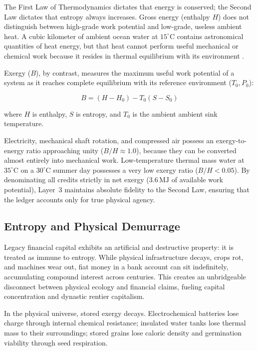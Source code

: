 The First Law of Thermodynamics dictates that energy is conserved; the Second Law dictates that entropy always increases. Gross energy (enthalpy $H$) does not distinguish between high-grade work potential and low-grade, useless ambient heat. A cubic kilometer of ambient ocean water at $15^\circ\mathrm{C}$ contains astronomical quantities of heat energy, but that heat cannot perform useful mechanical or chemical work because it resides in thermal equilibrium with its environment \parencite{jorgensen2001thermodynamics}.

Exergy ($B$), by contrast, measures the maximum useful work potential of a system as it reaches complete equilibrium with its reference environment ($T_0, P_0$):

\begin{equation}
B = (H - H_0) - T_0 (S - S_0)
\label{eq:ch4_exergy_helmholtz}
\end{equation}

where $H$ is enthalpy, $S$ is entropy, and $T_0$ is the ambient ambient sink temperature. 

Electricity, mechanical shaft rotation, and compressed air possess an exergy-to-energy ratio approaching unity ($B/H \approx 1.0$), because they can be converted almost entirely into mechanical work. Low-temperature thermal mass water at $35^\circ\mathrm{C}$ on a $30^\circ\mathrm{C}$ summer day possesses a very low exergy ratio ($B/H < 0.05$). By denominating all credits strictly in net exergy ($3.6\,\mathrm{MJ}$ of available work potential), Layer~3 maintains absolute fidelity to the Second Law, ensuring that the ledger accounts only for true physical agency.

\subsection{Entropy and Physical Demurrage}

Legacy financial capital exhibits an artificial and destructive property: it is treated as immune to entropy. While physical infrastructure decays, crops rot, and machines wear out, fiat money in a bank account can sit indefinitely, accumulating compound interest across centuries. This creates an unbridgeable disconnect between physical ecology and financial claims, fueling capital concentration and dynastic rentier capitalism.

In the physical universe, stored exergy decays. Electrochemical batteries lose charge through internal chemical resistance; insulated water tanks lose thermal mass to their surroundings; stored grains lose caloric density and germination viability through seed respiration.

